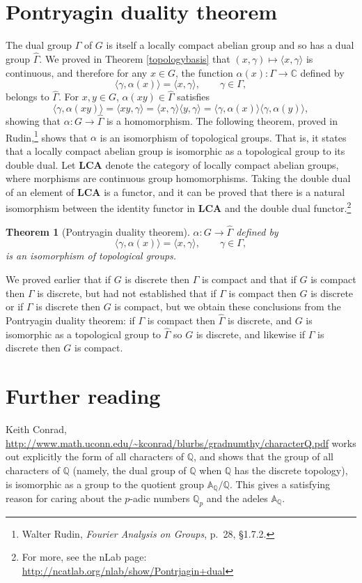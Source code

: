 \documentclass{article}
\newcommand{\inner}[2]{\langle #1, #2 \rangle}
\newtheorem{theorem}{Theorem}
\begin{document}
\section{Pontryagin duality theorem}
The dual group $\Gamma$ of $G$ is itself a locally compact abelian group and so has a dual group $\widehat{\Gamma}$.
We proved in Theorem \ref{topologybasis} that $(x,\gamma) \mapsto \inner{x}{\gamma}$ is continuous,
and therefore for any $x \in G$, the function $\alpha(x):\Gamma \to \mathbb{C}$ defined by
\[
\inner{\gamma}{\alpha(x)} = \inner{x}{\gamma}, \qquad \gamma \in \Gamma, 
\]
belongs to $\widehat{\Gamma}$. For $x,y \in G$, $\alpha(xy) \in \widehat{\Gamma}$ satisfies
\[
\inner{\gamma}{\alpha(xy)} = \inner{xy}{\gamma} = \inner{x}{\gamma} \inner{y}{\gamma} = \inner{\gamma}{\alpha(x)}
\inner{\gamma}{\alpha(y)},
\]
showing that $\alpha:G \to \widehat{\Gamma}$ is a homomorphism. The following theorem, proved in Rudin,\footnote{Walter Rudin, {\em Fourier Analysis on Groups},
p.~28, \S 1.7.2.} shows that $\alpha$ is an isomorphism
of topological groups. That is, it states that a locally compact abelian group is isomorphic as a topological group to
its double dual. Let $\textbf{LCA}$ denote the category of locally compact abelian groups, where morphisms are continuous group
homomorphisms. Taking the double dual of an element of \textbf{LCA} is a functor, and it can be proved that there is a natural
isomorphism between the identity functor in \textbf{LCA} and the double dual functor.\footnote{For more, see the nLab page:
\url{http://ncatlab.org/nlab/show/Pontrjagin+dual}}

\begin{theorem}[Pontryagin duality theorem]
$\alpha:G \to \widehat{\Gamma}$ defined by
\[
\inner{\gamma}{\alpha(x)} = \inner{x}{\gamma}, \qquad \gamma \in \Gamma, 
\]
is an isomorphism of topological groups.
\end{theorem}


We proved earlier that if $G$ is discrete then $\Gamma$ is compact and that if $G$ is compact then $\Gamma$ is discrete, but had not
established that if $\Gamma$ is compact then $G$ is discrete or if $\Gamma$ is discrete then $G$ is compact, but we obtain these conclusions
 from
the Pontryagin 
duality theorem: if $\Gamma$ is compact then $\widehat{\Gamma}$ is discrete, and $G$ is isomorphic as a topological group
to $\widehat{\Gamma}$ so $G$ is discrete, and likewise if $\Gamma$ is discrete then $G$ is compact.







\section{Further reading}
Keith Conrad, \url{http://www.math.uconn.edu/~kconrad/blurbs/gradnumthy/characterQ.pdf} works out explicitly the form of all characters of $\mathbb{Q}$, and
shows that the group of all characters of $\mathbb{Q}$ (namely, the dual group of $\mathbb{Q}$ when $\mathbb{Q}$ has the discrete topology), is isomorphic
as a group to the quotient
group
$\mathbb{A}_\mathbb{Q}/\mathbb{Q}$. This gives a satisfying reason for caring about the $p$-adic numbers $\mathbb{Q}_p$ and the adeles $\mathbb{A}_\mathbb{Q}$.
\end{document}
